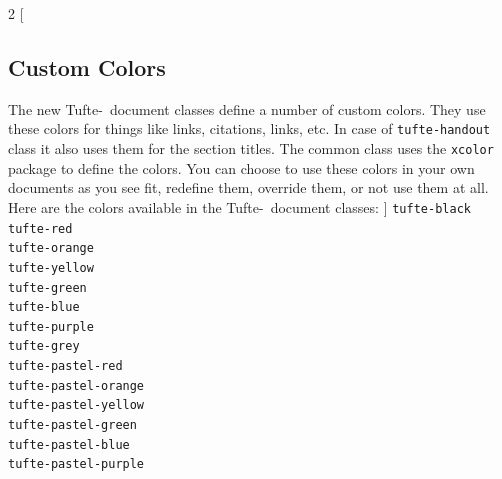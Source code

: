 \documentclass[a4paper]{tufte-handout}
\newcommand{\TL}{Tufte-\hologo{LaTeX}\xspace}
\newcommand{\hlorange}[1]{\textcolor{tufte-orange}{#1}}
\newcommand{\docpkg}[1]{\hlorange{\texttt{#1}}}
\newcommand{\doccls}[1]{\texttt{#1}}
\begin{document}
\begin{multicols}{2} [
  \subsection{Custom Colors}\label{ssec:custom-colors}
    The new \TL\ document classes define a number of custom colors.
    They use these colors for things like links, citations, links, etc.
    In case of \doccls{tufte-handout} class it also uses them for the section titles.
    The common class uses the \docpkg{xcolor} package to define the colors.
    You can choose to use these colors in your own documents as you see fit, redefine them, override them, or not use them at all.
    Here are the colors available in the \TL\ document classes:
]
\noindent
{}
\Verb|tufte-black| \\
\Verb|tufte-red| \\
\Verb|tufte-orange| \\
\Verb|tufte-yellow| \\
\Verb|tufte-green| \\
\Verb|tufte-blue| \\
\Verb|tufte-purple| \\
\Verb|tufte-grey| \\
\Verb|tufte-pastel-red| \\
\Verb|tufte-pastel-orange| \\
\Verb|tufte-pastel-yellow| \\
\Verb|tufte-pastel-green| \\
\Verb|tufte-pastel-blue| \\
\Verb|tufte-pastel-purple|
\end{multicols}
\end{document}

